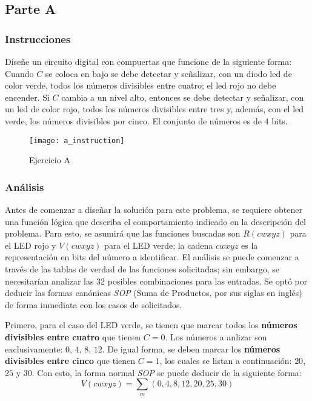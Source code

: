 \documentclass[../procedimientos.tex]{subfiles}
\begin{document}
\subsection{Parte A}
\subsubsection{Instrucciones}
Diseñe un circuito digital con compuertas que funcione de la siguiente forma:
Cuando $C$ se coloca en bajo se debe detectar y señalizar, con un diodo led de 
color verde, todos los números divisibles entre cuatro; el led rojo no debe 
encender. Si $C$ cambia a un nivel alto, entonces se debe detectar y 
señalizar, con un led de color rojo, todos los números divisibles entre tres 
y, además, con el led verde, los números divisibles por cinco. El conjunto de 
números es de 4 bits.
\begin{figure}[H]
  \centering
  \texttt{[image: a\_instruction]}
  \caption{Ejercicio A}
  \label{fig:a_inst}
\end{figure}

\subsubsection{Análisis}\label{subs:analisis_a}
Antes de comenzar a diseñar la solución para este problema, se requiere 
obtener una función lógica que describa el comportamiento indicado en la 
descripción del problema. Para esto, se asumirá que las funciones buscadas son 
$R(cwxyz)$ para el LED rojo y $V(cwxyz)$ para el LED verde; la cadena $cwxyz$ 
es la representación en bits del número a identificar. El análisis se puede 
comenzar a través de las tablas de verdad de las funciones solicitadas; sin 
embargo, se necesitarían analizar las 32 posibles combinaciones para las 
entradas. Se optó por deducir las formas canónicas \textit{SOP} (Suma de 
Productos, por sus siglas en inglés) de forma inmediata con los casos de 
solicitados.

Primero, para el caso del LED verde, se tienen que marcar todos los 
\textbf{números divisibles entre cuatro} que tienen $C=0$. Los números a 
anlizar son exclusivamente: $0$, $4$, $8$, $12$. De igual forma, se deben 
marcar los \textbf{números divisibles entre cinco} que tienen $C=1$, los 
cuales se listan a continuación: $20$, $25$ y $30$. Con esto, la forma normal 
\textit{SOP} se puede deducir de la siguiente forma:
\begin{equation*}
  V(cwxyz) = \sum_m (0, 4, 8, 12, 20, 25, 30)
\end{equation*}
\end{document}

